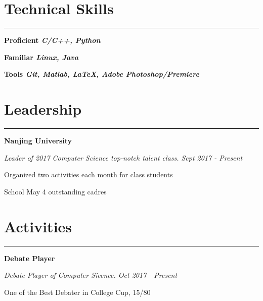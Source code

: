 \documentclass[letterpaper]{article}
\renewenvironment{itemize}{
  \begin{list}{}{
    \setlength{\leftmargin}{1.5em}
  }
}{
  \end{list}
}
\begin{document}
\section*{Technical Skills}
\noindent\rule[10pt]{\textwidth}{0.2pt}\vspace{-30pt}
\begin{itemize}
  \setlength{\itemsep}{-2pt}
  \item \bfseries{Proficient} {\it C/C++, Python}
  \item \bfseries{Familiar} {\it Linux, Java}
  \item \bfseries{Tools} {\it Git, Matlab, \LaTeX, Adobe Photoshop/Premiere}
\end{itemize}

\section*{Leadership}
\noindent\rule[10pt]{\textwidth}{0.2pt}\vspace{-30pt}\begin{itemize}
  \setlength{\itemsep}{-2pt}
  \item {\bfseries Nanjing University}
  \item {\it Leader of 2017 Computer Science top-notch talent class. \hfill Sept 2017 - Present}
  \vspace{-6pt} 
  \begin{itemize}
    \setlength{\itemsep}{-2pt}
    \item[$\circ$] {Organized two activities each month for class students}
    \item[$\circ$] {School May 4 outstanding cadres} 
  \end{itemize}
\end{itemize}

\section*{Activities}
\noindent\rule[10pt]{\textwidth}{0.2pt}\vspace{-30pt}\begin{itemize}
  \setlength{\itemsep}{-2pt}
  \item {\bfseries Debate Player}
  \item {\it Debate Player of Computer Sicence. \hfill Oct 2017 - Present}
  \vspace{-6pt} 
  \begin{itemize}
    \setlength{\itemsep}{-2pt}
    \item[$\circ$] {One of the Best Debater in College Cup, 15/80}
  \end{itemize}
\end{itemize}
\end{document}
